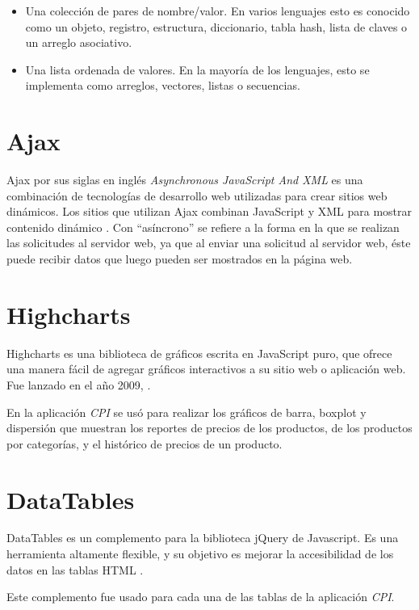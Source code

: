 \begin{itemize}
	\item Una colección de pares de nombre/valor. En varios lenguajes esto es conocido como un objeto, registro, estructura, diccionario, tabla hash, lista de claves o un arreglo asociativo.
    \item Una lista ordenada de valores. En la mayoría de los lenguajes, esto se implementa como arreglos, vectores, listas o secuencias.
\end{itemize}

\section{Ajax}
Ajax por sus siglas en inglés \textit{Asynchronous JavaScript And XML} es una combinación de tecnologías de desarrollo web utilizadas para crear sitios web dinámicos. Los sitios que utilizan Ajax combinan JavaScript y XML para mostrar contenido dinámico \cite{ajaxChristensson}. Con “asíncrono” se refiere a la forma en la que se realizan las solicitudes al servidor web, ya que al enviar una solicitud al servidor web, éste puede recibir datos que luego pueden ser mostrados en la página web.

\section{Highcharts}
Highcharts es una biblioteca de gráficos escrita en JavaScript puro, que ofrece una manera fácil de agregar gráficos interactivos a su sitio web o aplicación web. Fue lanzado en el año 2009, \cite{highcharts}. 

En la aplicación \textit{CPI} se usó para realizar los gráficos de barra, boxplot y dispersión que muestran los reportes de precios de los productos, de los productos por categorías, y el histórico de precios de un producto.


\section{DataTables}
DataTables es un complemento para la biblioteca jQuery de Javascript. Es una herramienta altamente flexible, y su objetivo es mejorar la accesibilidad de los datos en las tablas HTML \cite{dataTables}. 

Este complemento fue usado para cada una de las tablas de la aplicación \textit{CPI}.


